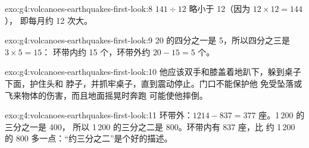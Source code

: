 \begin{solution}{exo:g4:volcanoes-earthquakes-first-look:8}
$141 \div 12$ 略小于 12（因为 $12 \times 12 = 144$），
即每月约 12 次大。
\end{solution}

\begin{solution}{exo:g4:volcanoes-earthquakes-first-look:9}
20 的四分之一是 5，所以四分之三是 $3 \times 5 = 15$：
环带内约 15 个，环带外约 $20 - 15 = 5$ 个。
\end{solution}

\begin{solution}{exo:g4:volcanoes-earthquakes-first-look:10}
他应该双手和膝盖着地趴下，躲到桌子下面，护住头和
脖子，并抓牢桌子，直到震动停止。门口不能保护他
免受坠落或飞来物体的伤害，而且地面摇晃时奔跑
可能使他摔倒。
\end{solution}

\begin{solution}{exo:g4:volcanoes-earthquakes-first-look:11}
环带外：$1214 - 837 = 377$ 座。1\,200 的三分之一是 400，
所以 1\,200 的三分之二是 800。环带内有 837 座，比
约 1\,200 的 800 多一点：“约三分之二”是个好的描述。
\end{solution}
